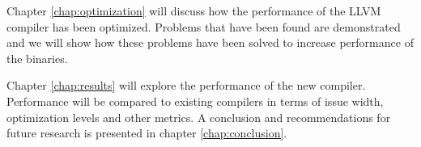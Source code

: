 Chapter \ref{chap:optimization} will discuss how the performance of the LLVM compiler has been optimized. Problems that have been found are demonstrated and we will show how these problems have been solved to increase performance of the binaries.

Chapter \ref{chap:results} will explore the performance of the new compiler. Performance will be compared to existing compilers in terms of issue width, optimization levels and other metrics. A conclusion and recommendations for future research is presented in chapter \ref{chap:conclusion}.  


\acresetall

